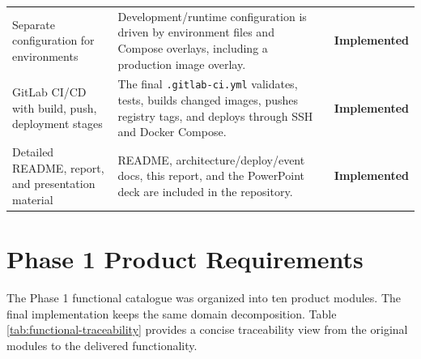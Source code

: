\documentclass[12pt,a4paper]{report}
\newcommand{\implemented}{\textcolor{successgreen}{\textbf{Implemented}}}
\begin{document}
\begin{longtable}{L{0.32\textwidth}L{0.48\textwidth}C{0.13\textwidth}}
Separate configuration for environments & Development/runtime configuration is driven by environment files and Compose overlays, including a production image overlay. & \implemented \\
GitLab CI/CD with build, push, deployment stages & The final \texttt{.gitlab-ci.yml} validates, tests, builds changed images, pushes registry tags, and deploys through SSH and Docker Compose. & \implemented \\
Detailed README, report, and presentation material & README, architecture/deploy/event docs, this report, and the PowerPoint deck are included in the repository. & \implemented \\
\bottomrule
\end{longtable}

\section{Phase 1 Product Requirements}
\label{sec:phase1-product-requirements}

The Phase 1 functional catalogue was organized into ten product modules. The
final implementation keeps the same domain decomposition. Table
\ref{tab:functional-traceability} provides a concise traceability view from the
original modules to the delivered functionality.
\end{document}
